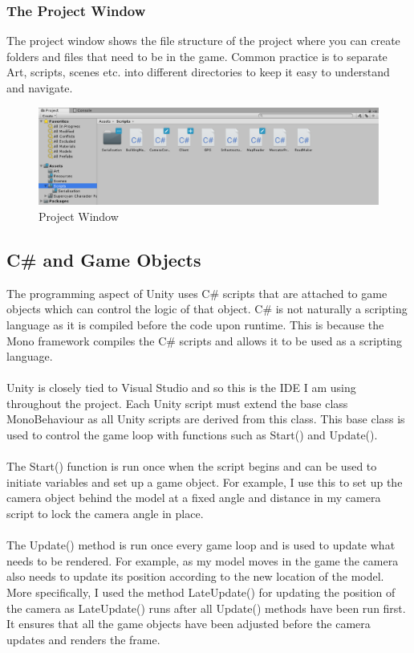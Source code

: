 \documentclass[a4paper]{report}
\begin{document}
\subsubsection{The Project Window}
The project window shows the file structure of the project where you can create folders and files that need to be in the game. Common practice is to separate Art, scripts, scenes etc. into different directories to keep it easy to understand and navigate.
\begin{figure}[h]
	\centering
	\includegraphics[scale=0.55]{project}
	\caption{Project Window}
\end{figure}
\subsection{C\# and Game Objects}
The programming aspect of Unity uses C\# scripts that are attached to game objects which can control the logic of that object. C\# is not naturally a scripting language as it is compiled before the code upon runtime. This is because the Mono framework compiles the C\# scripts and allows it to be used as a scripting language. \cite{Mono}
\\\\
Unity is closely tied to Visual Studio and so this is the IDE I am using throughout the project. Each Unity script must extend the base class MonoBehaviour as all Unity scripts are derived from this class. This base class is used to control the game loop with functions such as Start() and Update().  
\\\\
The Start() function is run once when the script begins and can be used to initiate variables and set up a game object. For example, I use this to set up the camera object behind the model at a fixed angle and distance in my camera script to lock the camera angle in place.
\\\\
The Update() method is run once every game loop and is used to update what needs to be rendered. For example, as my model moves in the game the camera also needs to update its position according to the new location of the model. More specifically, I used the method LateUpdate() for updating the position of the camera as LateUpdate() runs after all Update() methods have been run first. It ensures that all the game objects have been adjusted before the camera updates and renders the frame. \cite{Unity}
\end{document}
